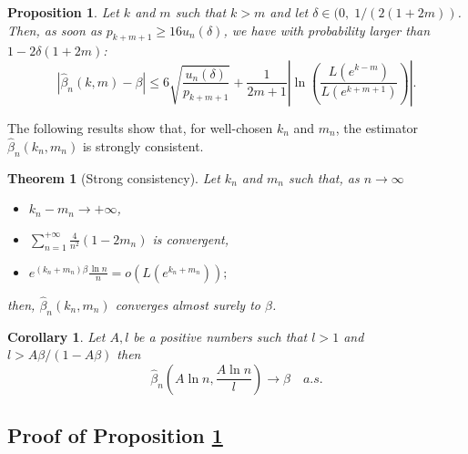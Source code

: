 \documentclass[sn-mathphys-ay]{sn-jnl}%
\newtheorem{theorem}{Theorem}[section]%
\newtheorem{proposition}{Proposition}[section]%
\newtheorem{corollary}{Corollary}[section]
\begin{document}
\begin{appendices}
\begin{proposition}\label{bias_variance_thm_average}
    Let \(k\) and \(m\) such that \(k>m\) and let \(\delta\in (0,\; 1/(2(1+2m))\).
    Then, as soon as \(p_{k+m+1}\geq 16 u_n(\delta)\), we have with probability
    larger than \(1-2\delta(1+2m)\):
    \begin{equation}\label{rateConvergenceAverage}
        \left| {\widehat \beta_n \left( {k,m} \right) - \beta } \right| \leqslant 6\sqrt {\frac{{{u_n}\left( \delta  \right)}}{{{p_{k + m + 1}}}}}  + \frac{1}{{2m + 1}}\left| {\ln \left( {\frac{{L\left( {{e^{k - m}}} \right)}}{{L\left( {{e^{k + m + 1}}} \right)}}} \right)} \right|.
    \end{equation}
\end{proposition}

The following results show that, for well-chosen \(k_n\) and \(m_n\), the estimator
\(\widehat{\beta}_n(k_n,m_n)\) is strongly consistent.

\begin{theorem}[Strong consistency]\label{consistency_average}
    Let \(k_n\) and \(m_n\) such that, as $n\to\infty$
    \begin{itemize}
        \item[i)] \({k_n} - {m_n} \to + \infty\),
        \item[ii)] \(\sum\limits_{n = 1}^{ + \infty } {\frac{4}{{{n^2}}}\left( {1 -
                  2{m_n}} \right)}\) is convergent,
        \item[iii)] \({e^{\left( {{k_n} + {m_n}} \right)\beta }}\frac{{\ln n}}{n} =
              o\left( {L\left( {{e^{{k_n} + {m_n}}}} \right)} \right);\)
    \end{itemize}
    then, \(\widehat \beta_n \left( {k_n,m_n} \right)\) converges almost surely to \(\beta\).
\end{theorem}

\begin{corollary}\label{consistency_ln_average}
    Let \(A,l\) be a positive numbers such that \(l>1\) and $l>{A\beta}/{(1-A\beta)}$ then
    \begin{equation*}
        \widehat \beta_n \left( {A\ln n,\frac{{A\ln n}}{l}} \right) \to \beta\quad a.s.
    \end{equation*}
\end{corollary}

\subsection{Proof of Proposition \ref{bias_variance_thm_average}}


\end{appendices}
\end{document}
